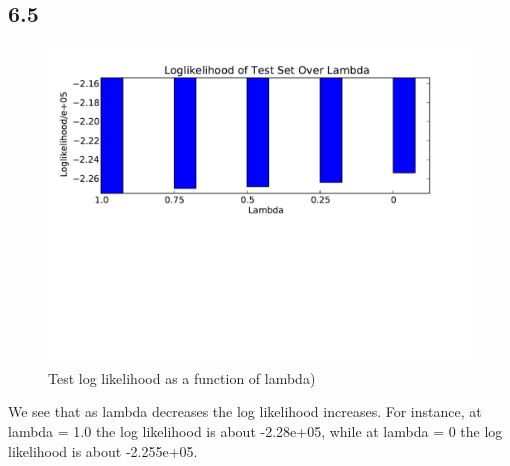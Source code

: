 \documentclass{article}
\begin{document}
\subsection*{6.5}
\begin{figure}[H]
  \caption{Test log likelihood as a function of lambda)}
  \centering
    \includegraphics[width=1.0\textwidth]{q6_p5.pdf}
\end{figure}

We see that as lambda decreases the log likelihood
increases. For instance, at lambda = 1.0 the log likelihood is about -2.28e+05, while at lambda = 0 the log likelihood is about
-2.255e+05.
\end{document}
